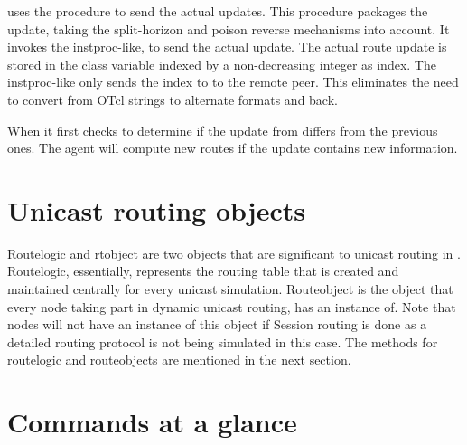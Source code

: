  uses the procedure
to send the actual updates.
This procedure packages the update, taking the
split-horizon and poison reverse mechanisms into account.
It invokes the instproc-like,
to send the actual update.
The actual route update is stored in the class variable
 indexed by a non-decreasing integer as index.
The instproc-like only sends the index to  to the remote peer.
This eliminates the need to convert from OTcl strings to alternate formats
and back.

When 
it first checks to determine if the update from differs from the previous
ones.
The agent will compute new routes if the update contains new information.


\section{Unicast routing objects}
\label{sec:routeobjects}
Routelogic and rtobject are two objects that are significant to unicast
routing in \ns. Routelogic, essentially, represents the routing table
that is created and maintained centrally for every unicast simulation.
Routeobject is the object that every node taking part in dynamic
unicast routing, has an instance of. Note that nodes will not have an
instance of this object if Session routing is done as a detailed
routing protocol is not being simulated in this case. The methods for
routelogic and routeobjects are mentioned in the next section.


\section{Commands at a glance}
\label{sec:unicastcommand}

